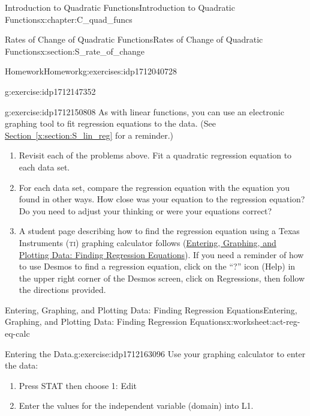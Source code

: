 \documentclass[oneside,10pt,]{book}
\newcommand{\xreffont}{\relax}
\newcommand{\initialism}[1]{\textsc{\MakeLowercase{#1}}}
\numberwithin{equation}{chapter}
\begin{document}
\begin{chapterptx}{Introduction to Quadratic Functions}{}{Introduction to Quadratic Functions}{}{}{x:chapter:C_quad_funcs}
\begin{sectionptx}{Rates of Change of Quadratic Functions}{}{Rates of Change of Quadratic Functions}{}{}{x:section:S_rate_of_change}
\begin{exercises-subsection}{Homework}{}{Homework}{}{}{g:exercises:idp1712040728}
\begin{divisionexercise}{5}{}{}{g:exercise:idp1712147352}
\begin{enumerate}[font=\bfseries,label=(\alph*),ref=\alph*]
\end{enumerate}
\end{divisionexercise}%
\begin{divisionexercise}{6}{}{}{g:exercise:idp1712150808}%
As with linear functions, you can use an electronic graphing tool to fit regression equations to the data. (See \hyperref[x:section:S_lin_reg]{Section~{\xreffont\ref{x:section:S_lin_reg}}} for a reminder.)%
\begin{enumerate}[font=\bfseries,label=(\alph*),ref=\alph*]
\item{}Revisit each of the problems above. Fit a quadratic regression equation to each data set.%
\item{}For each data set, compare the regression equation with the equation you found in other ways. How close was your equation to the regression equation? Do you need to adjust your thinking or were your equations correct?%
\item{}A student page describing how to find the regression equation using a Texas Instruments (\initialism{TI}) graphing calculator follows (\hyperref[x:worksheet:act-reg-eq-calc]{Entering, Graphing, and Plotting Data: Finding Regression Equations}). If you need a reminder of how to use Desmos to find a regression equation, click on the ``?'' icon (Help) in the upper right corner of the Desmos screen, click on Regressions, then follow the directions provided.%
\end{enumerate}
\end{divisionexercise}%
\end{exercises-subsection}
%
%
\typeout{************************************************}
\typeout{************************************************}
%
\begin{worksheet-subsection}{Entering, Graphing, and Plotting Data: Finding Regression Equations}{}{Entering, Graphing, and Plotting Data: Finding Regression Equations}{}{}{x:worksheet:act-reg-eq-calc}
\begin{divisionexercise}{1}{Entering the Data.}{}{g:exercise:idp1712163096}%
Use your graphing calculator to enter the data:%
\begin{enumerate}[font=\bfseries,label=(\alph*),ref=\alph*]
\item{}Press STAT then choose 1: Edit\textellipsis{}%
\item{}Enter the values for the independent variable (domain) into L1.%

\end{enumerate}
\end{divisionexercise}
\end{worksheet-subsection}
\end{sectionptx}
\end{chapterptx}
\end{document}
